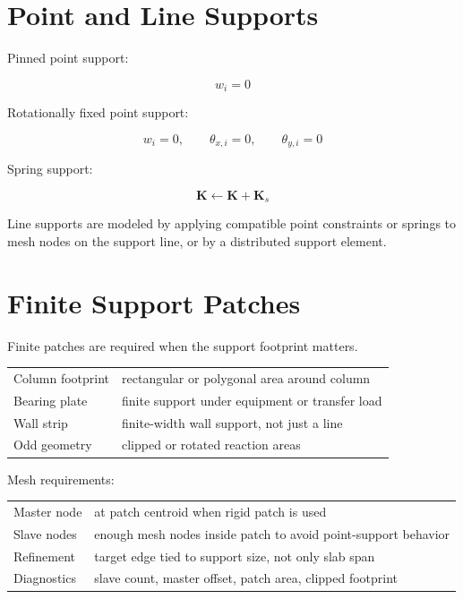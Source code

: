 \documentclass[10pt]{article}
\begin{document}
\section{Point and Line Supports}

Pinned point support:

\begin{equation}
w_i = 0
\end{equation}

Rotationally fixed point support:

\begin{equation}
w_i=0,\qquad \theta_{x,i}=0,\qquad \theta_{y,i}=0
\end{equation}

Spring support:

\begin{equation}
\mathbf K \leftarrow \mathbf K + \mathbf K_s
\end{equation}

Line supports are modeled by applying compatible point constraints or springs to
mesh nodes on the support line, or by a distributed support element.

\section{Finite Support Patches}

Finite patches are required when the support footprint matters.


{\ttfamily\footnotesize
\begin{tabular}{@{}p{1.8in}p{4.7in}@{}}
Column footprint & rectangular or polygonal area around column \\
Bearing plate & finite support under equipment or transfer load \\
Wall strip & finite-width wall support, not just a line \\
Odd geometry & clipped or rotated reaction areas \\
\end{tabular}
}

Mesh requirements:

{\ttfamily\footnotesize
\begin{tabular}{@{}p{1.8in}p{4.7in}@{}}
Master node & at patch centroid when rigid patch is used \\
Slave nodes & enough mesh nodes inside patch to avoid point-support behavior \\
Refinement & target edge tied to support size, not only slab span \\
Diagnostics & slave count, master offset, patch area, clipped footprint \\
\end{tabular}
}
\end{document}
